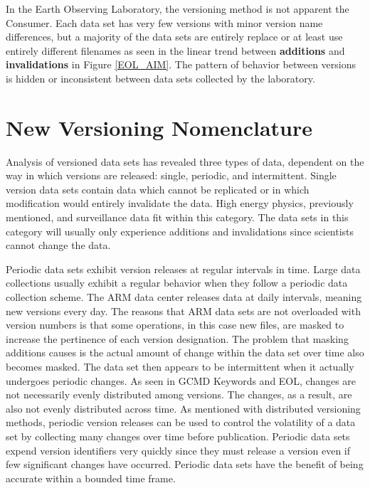 In the Earth Observing Laboratory, the versioning method is not apparent the Consumer.
Each data set has very few versions with minor version name differences, but a majority of the data sets are entirely replace or at least use entirely different filenames as seen in the linear trend between \textbf{additions} and \textbf{invalidations} in Figure \ref{EOL_AIM}.
The pattern of behavior between versions is hidden or inconsistent between data sets collected by the laboratory.

\section{New Versioning Nomenclature}
Analysis of versioned data sets has revealed three types of data, dependent on the way in which versions are released: single, periodic, and intermittent.
Single version data sets contain data which cannot be replicated or in which modification would entirely invalidate the data.
High energy physics, previously mentioned, and surveillance data fit within this category.
The data sets in this category will usually only experience additions and invalidations since scientists cannot change the data.

Periodic data sets exhibit version releases at regular intervals in time.  Large data collections usually exhibit a regular behavior when they follow a periodic data collection scheme.
The ARM data center releases data at daily intervals, meaning new versions every day.
The reasons that ARM data sets are not overloaded with version numbers is that some operations, in this case new files, are masked to increase the pertinence of each version designation.
The problem that masking additions causes is the actual amount of change within the data set over time also becomes masked.
The data set then appears to be intermittent when it actually undergoes periodic changes.  As seen in GCMD Keywords and EOL, changes are not necessarily evenly distributed among versions.  The changes, as a result, are also not evenly distributed across time.  As mentioned with distributed versioning methods, periodic version releases can be used to control the volatility of a data set by collecting many changes over time before publication.  Periodic data sets expend version identifiers very quickly since they must release a version even if few significant changes have occurred.
Periodic data sets have the benefit of being accurate within a bounded time frame.

